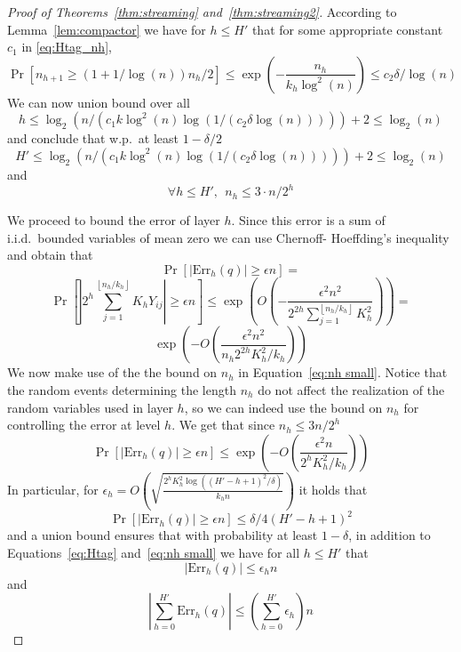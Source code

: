\documentclass[anon,12pt]{colt2019} %
\newcommand{\eps}{\epsilon}
\newcommand{\floor}[1]{\left \lfloor #1 \right \rfloor}
\renewcommand{\Pr}{\operatorname{Pr}}
\begin{document}
\begin{proof} [Proof of Theorems~\ref{thm:streaming} and~\ref{thm:streaming2}]
According to Lemma~\ref{lem:compactor} we have for $ h\leq H'$ that for some appropriate constant $c_1$ in  \eqref{eq:Htag_nh},
$$ \Pr[n_{h+1} \geq (1+1/\log(n))n_{h}/2] \leq \exp\left( -\frac{n_{h}}{k_h \log^2(n)}  \right) \leq c_2\delta/  \log(n) $$
We can now union bound over all 
$$h \leq \log_2\left( n / \left( c_1 k \log^2(n) \log(1/(c_2 \delta\log(n))) \right)\right) + 2 \leq \log_2(n)$$
and conclude that w.p.\ at least $1-\delta/2$
\begin{equation} \label{eq:Htag}
H' \leq \log_2\left( n / \left( c_1 k \log^2(n) \log(1/(c_2 \delta \log(n))) \right)\right) + 2 \leq \log_2(n)
\end{equation}
and
\begin{equation} \label{eq:nh small}
\forall h \leq H', \ \ n_{h} \leq 3 \cdot n/2^{h}
\end{equation}


We proceed to bound the error of layer $h$. Since this error is a sum of i.i.d.\ bounded variables of mean zero we can use Chernoff- Hoeffding's inequality and obtain that
$$ \Pr\left[   \left| \text{Err}_h(q) \right| \geq \eps n \right] =$$
$$ \Pr\left[   \left| 2^h \sum_{j=1}^{\floor{n_h/k_h} } K_h Y_{ij} \right| \geq \eps n \right] \leq \exp \left( O\left( -\frac{ \eps^2 n^2}{ 2^{2h} \sum_{j=1}^{\floor{n_h/k_h} } K_h^2}   \right)\right) =$$
$$\exp \left( -O\left(\frac{\eps^2 n^2}{n_h 2^{2h} K_h^2/k_h  } \right) \right) 
$$
We now make use of the the bound on $n_h$ in Equation~\eqref{eq:nh small}. Notice that the random events determining the length $n_h$ do not affect the realization of the random variables used in layer $h$, so we can indeed use the bound on $n_h$ for controlling the error at level $h$. We get that since $n_h \leq 3n/2^h$
$$ \Pr\left[   \left| \text{Err}_h(q) \right| \geq \eps n \right] \leq 
\exp \left( -O\left(\frac{\eps^2 n}{ 2^h K_h^2/k_h  } \right) \right) 
$$
In particular, for $\eps_h = O\left( \sqrt{\frac{2^h K_h^2 \log((H'-h+1)^2/\delta)}{k_h n}} \right)$  it holds that
$$ \Pr\left[   \left| \text{Err}_h(q) \right| \geq \eps n \right] \leq \delta/4(H'-h+1)^2$$
and a union bound ensures that with probability at least $1-\delta$, in addition to Equations~\eqref{eq:Htag} and~\eqref{eq:nh small} we have for all $h \leq H'$ that
$$\left| \text{Err}_h(q) \right| \leq \eps_h n$$
and 
$$\left| \sum_{h=0}^{H'} \text{Err}_h(q) \right| \leq \left(\sum_{h=0}^{H'} \eps_h\right)n $$


\end{proof}
\end{document}
